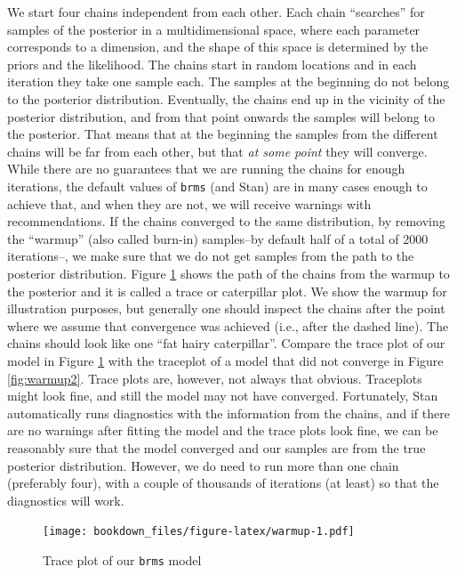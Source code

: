 \documentclass[12pt,]{krantz}
\theoremstyle{definition}
\theoremstyle{definition}
\theoremstyle{definition}
\theoremstyle{remark}
\begin{document}
We start four chains independent from each other. Each chain
``searches'' for samples of the posterior in a multidimensional space,
where each parameter corresponds to a dimension, and the shape of this
space is determined by the priors and the likelihood. The chains start
in random locations and in each iteration they take one sample each. The
samples at the beginning do not belong to the posterior distribution.
Eventually, the chains end up in the vicinity of the posterior
distribution, and from that point onwards the samples will belong to the
posterior. That means that at the beginning the samples from the
different chains will be far from each other, but that \emph{at some
point} they will converge. While there are no guarantees that we are
running the chains for enough iterations, the default values of
\texttt{brms} (and Stan) are in many cases enough to achieve that, and
when they are not, we will receive warnings with recommendations. If the
chains converged to the same distribution, by removing the ``warmup''
(also called burn-in) samples--by default half of a total of 2000
iterations--, we make sure that we do not get samples from the path to
the posterior distribution. Figure \ref{fig:warmup} shows the path of
the chains from the warmup to the posterior and it is called a trace or
caterpillar plot. We show the warmup for illustration purposes, but
generally one should inspect the chains after the point where we assume
that convergence was achieved (i.e., after the dashed line). The chains
should look like one ``fat hairy caterpillar''. Compare the trace plot
of our model in Figure \ref{fig:warmup} with the traceplot of a model
that did not converge in Figure \ref{fig:warmup2}. Trace plots are,
however, not always that obvious. Traceplots might look fine, and still
the model may not have converged. Fortunately, Stan automatically runs
diagnostics with the information from the chains, and if there are no
warnings after fitting the model and the trace plots look fine, we can
be reasonably sure that the model converged and our samples are from the
true posterior distribution. However, we do need to run more than one
chain (preferably four), with a couple of thousands of iterations (at
least) so that the diagnostics will work.



\begin{figure}
\centering
\texttt{[image: bookdown\_files/figure-latex/warmup-1.pdf]}
\caption{\label{fig:warmup}Trace plot of our \texttt{brms} model}
\end{figure}
\end{document}
